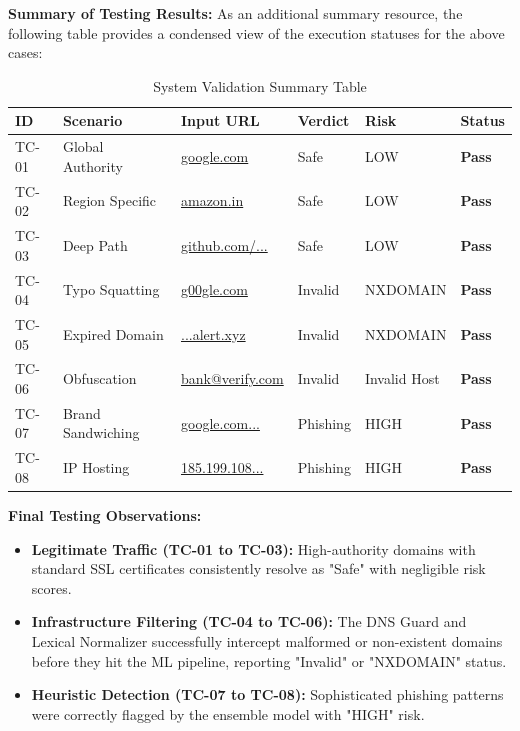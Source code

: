 \noindent
\textbf{Summary of Testing Results:}
\noindent
As an additional summary resource, the following table provides a condensed view of the execution statuses for the above cases:

\begin{table}[H]
\centering
\footnotesize
\renewcommand{\arraystretch}{1.5}
\caption{System Validation Summary Table}
\begin{tabularx}{\textwidth}{|l|p{3.5cm}|X|l|l|l|}
\hline
\textbf{ID} & \textbf{Scenario} & \textbf{Input URL} & \textbf{Verdict} & \textbf{Risk} & \textbf{Status} \\ \hline
TC-01 & Global Authority    & \url{google.com}       & Safe     & LOW          & \textbf{\textcolor{namegreen}{Pass}} \\ \hline
TC-02 & Region Specific     & \url{amazon.in}       & Safe     & LOW          & \textbf{\textcolor{namegreen}{Pass}} \\ \hline
TC-03 & Deep Path           & \url{github.com/...} & Safe     & LOW          & \textbf{\textcolor{namegreen}{Pass}} \\ \hline
TC-04 & Typo Squatting      & \url{g00gle.com}                   & Invalid  & NXDOMAIN     & \textbf{\textcolor{namegreen}{Pass}} \\ \hline
TC-05 & Expired Domain      & \url{...alert.xyz}       & Invalid  & NXDOMAIN     & \textbf{\textcolor{namegreen}{Pass}} \\ \hline
TC-06 & Obfuscation         & \url{bank@verify.com}       & Invalid  & Invalid Host & \textbf{\textcolor{namegreen}{Pass}} \\ \hline
TC-07 & Brand Sandwiching   & \url{google.com...}  & Phishing & HIGH         & \textbf{\textcolor{namegreen}{Pass}} \\ \hline
TC-08 & IP Hosting          & \url{185.199.108...} & Phishing & HIGH         & \textbf{\textcolor{namegreen}{Pass}} \\ \hline
\end{tabularx}
\end{table}

\noindent
\textbf{Final Testing Observations:}
\begin{itemize}
    \item \textbf{Legitimate Traffic (TC-01 to TC-03):} High-authority domains with standard SSL certificates consistently resolve as "Safe" with negligible risk scores.
    \item \textbf{Infrastructure Filtering (TC-04 to TC-06):} The DNS Guard and Lexical Normalizer successfully intercept malformed or non-existent domains before they hit the ML pipeline, reporting "Invalid" or "NXDOMAIN" status.
    \item \textbf{Heuristic Detection (TC-07 to TC-08):} Sophisticated phishing patterns were correctly flagged by the ensemble model with "HIGH" risk.
\end{itemize}

